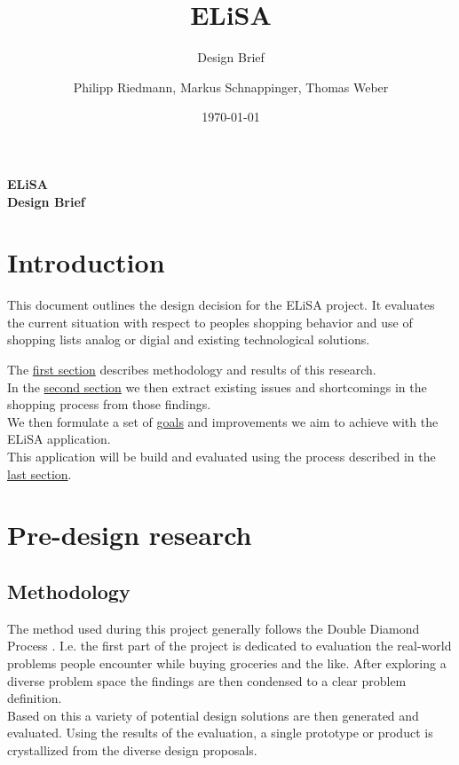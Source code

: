 \documentclass{scrartcl}
\title{ELiSA}
\subtitle{Design Brief}
\date{\today}
\author{Philipp Riedmann, Markus Schnappinger, Thomas Weber}
\begin{document}
\begin{titlepage}
   \begin{center}
      \LARGE\textbf{ELiSA}\\
      \vspace{0.75cm}
      \large\textbf{Design Brief}
   \end{center}
\end{titlepage}

\section{Introduction}
This document outlines the design decision for the ELiSA project.
It evaluates the current situation with respect to peoples shopping behavior and use of shopping lists analog or digial and existing technological solutions.

The \hyperref[sec:research]{first section} describes methodology and results of this research. \\

In the \hyperref[sec:problem]{second section} we then extract existing issues and shortcomings in the shopping process from those findings.\\

We then formulate a set of \hyperref[sec:goal]{goals} and improvements we aim to achieve with the ELiSA application.\\

This application will be build and evaluated using the process described in the \hyperref[sec:process]{last section}.

\section{Pre-design research}
\label{sec:research}
  \subsection{Methodology}
    The method used during this project generally follows the Double Diamond Process \cite{TODO}. 
    I.e. the first part of the project is dedicated to evaluation the real-world problems people encounter while buying groceries and the like. 
    After exploring a diverse problem space the findings are then condensed to a clear problem definition.\\
    Based on this a variety of potential design solutions are then generated and evaluated. Using the results of the evaluation, a single prototype or product is crystallized from the diverse design proposals.\\
\end{document}

